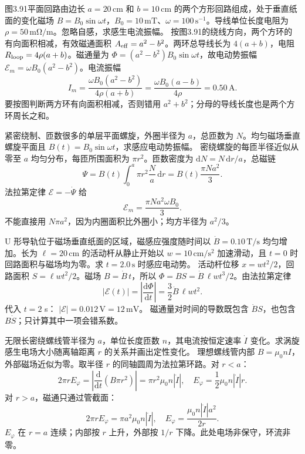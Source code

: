 图3.91平面回路由边长 $a=20\,\mathrm{cm}$ 和 $b=10\,\mathrm{cm}$ 的两个方形回路组成，处于垂直纸面的变化磁场 $B=B_0\sin\omega t$，$B_0=10\,\mathrm{mT}$、$\omega=100\,\mathrm{s^{-1}}$。导线单位长度电阻为 $\rho=50\,\mathrm{m\Omega/m}$。忽略自感，求感生电流振幅。
\exsolution
按图3.91的绕线方向，两个方环的有向面积相减，有效磁通面积 $A_{\rm eff}=a^2-b^2$。两环总导线长为 $4(a+b)$，电阻 $R_{\rm loop}=4\rho(a+b)$。磁通量为 $\Phi=(a^2-b^2)B_0\sin\omega t$，故电动势振幅
$\mathcal E_m=\omega B_0(a^2-b^2)$。电流振幅
\[
\boxed{I_m=\frac{\omega B_0(a^2-b^2)}{4\rho(a+b)}
=\frac{\omega B_0(a-b)}{4\rho}
=0.50\,\mathrm A}.
\]
\excheck 要按图判断两方环有向面积相减，否则错用 $a^2+b^2$；分母的导线长度也是两个方环周长之和。

紧密绕制、匝数很多的单层平面螺旋，外圈半径为 $a$，总匝数为 $N$。均匀磁场垂直螺旋平面且 $B(t)=B_0\sin\omega t$，求感应电动势振幅。
\exsolution
密绕螺旋的每匝半径近似从零至 $a$ 均匀分布，每匝所围面积为 $\pi r^2$。匝数密度为 $\mathrm dN=N\,\mathrm dr/a$，总磁链
\[
\Psi=B(t)\int_0^a\pi r^2\frac Na\,\mathrm dr
=B(t)\frac{\pi Na^2}{3}.
\]
法拉第定律 $\mathcal E=-\dot\Psi$ 给
\[
\boxed{\mathcal E_m=\frac{\pi Na^2\omega B_0}{3}}.
\]
\excheck 不能直接用 $N\pi a^2$，因为内圈面积比外圈小；均方半径为 $a^2/3$。

U 形导轨位于磁场垂直纸面的区域，磁感应强度随时间以 $\dot B=0.10\,\mathrm{T/s}$ 均匀增加。长为 $\ell=20\,\mathrm{cm}$ 的活动杆从静止开始以 $w=10\,\mathrm{cm/s^2}$ 加速滑动，且 $t=0$ 时回路面积与磁场均为零。求 $t=2.0\,\mathrm s$ 时感应电动势。
\exsolution
活动杆位移 $x=wt^2/2$，回路面积 $S=\ell wt^2/2$。磁场 $B=\dot B\,t$，所以
$\Phi=BS=\dot B\,\ell w t^3/2$。由法拉第定律
\[
\boxed{|\mathcal E(t)|=\left|\frac{\mathrm d\Phi}{\mathrm dt}\right|
=\frac32\dot B\,\ell w t^2}.
\]
代入 $t=2$ s：
$\boxed{|\mathcal E|=0.012\,\mathrm V=12\,\mathrm{mV}}$。
\excheck 磁通量对时间的导数既包含 $\dot B S$，也包含 $B\dot S$；只计算其中一项会错系数。

无限长密绕螺线管半径为 $a$，单位长度匝数 $n$，其电流按恒定速率 $\dot I$ 变化。求涡旋感生电场大小随离轴距离 $r$ 的关系并画出定性变化。
\exsolution
理想螺线管内部 $B=\mu_0nI$，外部磁场近似为零。取半径 $r$ 的同轴圆周为法拉第环路。对 $r<a$：
\[
2\pi rE_\varphi=\left|\frac{\mathrm d}{\mathrm dt}(B\pi r^2)\right|
=\pi r^2\mu_0n|\dot I|,
\quad \boxed{E_\varphi=\frac12\mu_0n|\dot I|r}.
\]
对 $r>a$，磁通只通过管截面：
\[
2\pi rE_\varphi=\pi a^2\mu_0n|\dot I|,
\quad\boxed{E_\varphi=\frac{\mu_0n|\dot I|a^2}{2r}}.
\]
\excheck $E_\varphi$ 在 $r=a$ 连续；内部按 $r$ 上升，外部按 $1/r$ 下降。此处电场非保守，环流非零。


